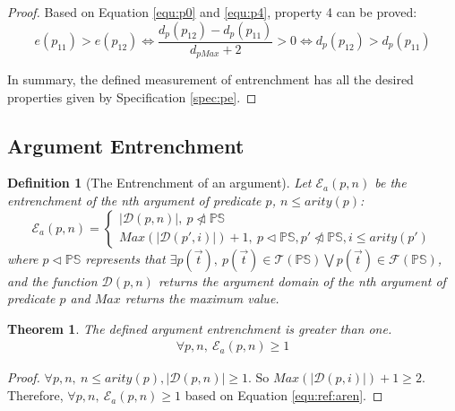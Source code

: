 \documentclass[11pt,letterpaper]{article}
\newtheorem{defn}{Definition}[section]
\newtheorem{theorem}{Theorem}[section]
\newcommand{\pf}[1]{\mathcal{#1}(\mathbb{PS})}
\begin{document}
\begin{proof}
Based on Equation \ref{equ:p0} and \ref{equ:p4}, property 4 can be proved:
 \begin{equation}\label{equ:p5}
 e(p_{11}) > e(p_{12}) \Leftrightarrow \frac{d_{p}(p_{12}) - d_{p}(p_{11})}{d_{pMax}+2} > 0 \Leftrightarrow d_{p}(p_{12}) > d_{p}(p_{11})
 \end{equation}

In summary, the defined measurement of entrenchment has all the desired properties given by Specification \ref{spec:pe}.

\end{proof}

\subsection{Argument Entrenchment}
\label{sec:ee:args}


\begin{defn}[The Entrenchment of an argument]
Let $ \mathcal{E}_{a}(p, n)$ be the entrenchment of the nth argument of predicate $p$, $n\leq arity(p)$:
\begin{equation}\label{equ:ref:aren}
    \mathcal{E}_{a}(p, n) =
    \begin{cases}
    |\mathcal{D}(p, n)|,\  p \ntriangleleft \mathbb{PS}\\
    Max(|\mathcal{D}(p', i)|)+1,\ p \triangleleft \mathbb{PS}, p' \ntriangleleft \mathbb{PS}, i\leq arity(p')
    \end{cases}
\end{equation}
where $p \triangleleft \mathbb{PS}$ represents that $\exists p(\vec{t}),\ p(\vec{t}) \in \pf{T} \bigvee p(\vec{t}) \in \pf{F}$, and the function $\mathcal{D}(p, n)$ returns the argument domain of the nth argument of predicate $p$ and $Max$ returns the maximum value.
\end{defn}


\begin{theorem}
The defined argument entrenchment is greater than one.
 \begin{align}
     \forall p, n,\ \mathcal{E}_{a}(p, n)\geq 1
 \end{align}
\end{theorem}
\begin{proof}
$\forall p, n,\ n \leq arity(p), |\mathcal{D}(p, n)|\geq 1$. So $Max(|\mathcal{D}(p, i)|)+1\geq 2$. \\
Therefore, $\forall p,n,\ \mathcal{E}_{a}(p, n)\geq 1$ based on Equation \ref{equ:ref:aren}.
\end{proof}
\end{document}
